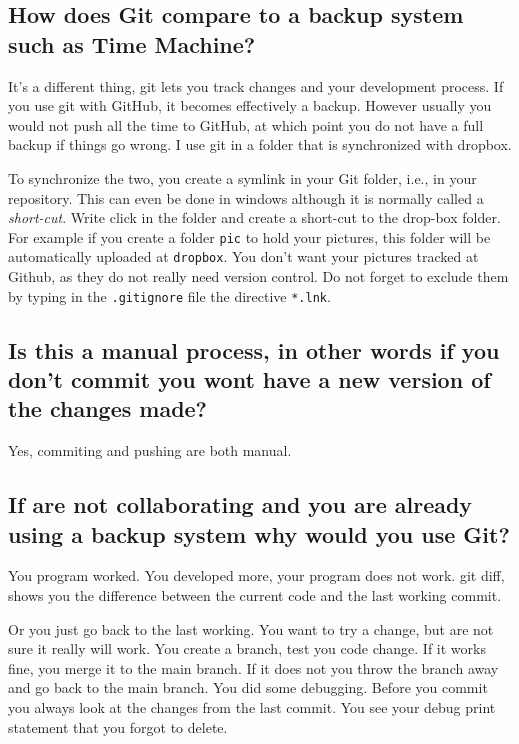 \subsection*{How does Git compare to a backup system such as Time Machine?}

It's a different thing, git lets you track changes and your development process. If you use git with GitHub, it becomes effectively a backup. However usually you would not push all the time to GitHub, at which point you do not have a full backup if things go wrong. I use git in a folder that is synchronized with dropbox.

 To synchronize the two, you create a symlink in your Git folder, i.e., in your repository. This can even be done in windows although it is normally called a \textit{short-cut}. Write click in the folder and create a short-cut to the drop-box folder. For example if you create a folder \texttt{pic} to hold your pictures, this folder will be automatically uploaded at \texttt{dropbox}. You don't want your pictures tracked at Github, as they do not really need version control. Do not forget to exclude them by typing in the \texttt{.gitignore} file the directive  \verb|*.lnk|.

\subsection*{Is this a manual process, in other words if you don't commit you wont have a new version of the changes made?}

Yes, commiting and pushing are both manual.

\subsection*{If are not collaborating and you are already using a backup system why would you use Git?}

 You program worked. You developed more, your program does not work. git diff, shows you the difference between the current code and the last working commit.

 Or you just go back to the last working. You want to try a change, but are not sure it really will work. 
 You create a branch, test you code change. If it works fine, you merge it to the main branch. If it does not you throw the branch away and go back to the main branch.
 You did some debugging. Before you commit you always look at the changes from the last commit. You see your debug print statement that you forgot to delete.

